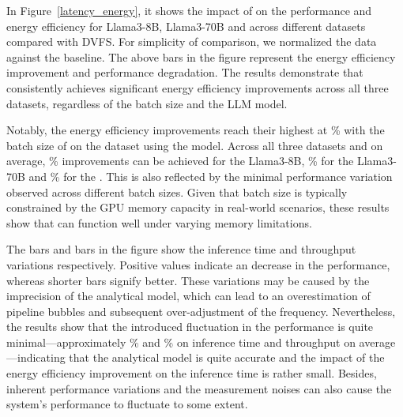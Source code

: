 In Figure~\ref{latency_energy}, it shows the impact of \thisproj{} on the performance and energy efficiency for Llama3-8B, Llama3-70B and  across different datasets compared with DVFS.
For simplicity of comparison, we normalized the data against the baseline.
The above bars in the figure represent the energy efficiency improvement and performance degradation.
The results demonstrate that \thisproj{} consistently achieves significant energy efficiency improvements across all three datasets, regardless of the batch size and the LLM model.

Notably, the energy efficiency improvements reach their highest at \% with the batch size of  on the  dataset using the  model.
Across all three datasets and on average, \% improvements can be achieved for the Llama3-8B, \% for the Llama3-70B and \% for the .
This is also reflected by the minimal performance variation observed across different batch sizes.
Given that batch size is typically constrained by the GPU memory capacity in real-world scenarios, these results show that \thisproj{} can function well under varying memory limitations.

The  bars and  bars in the figure show the inference time and throughput variations respectively.
Positive values indicate an decrease in the performance, whereas shorter bars signify better.
These variations may be caused by the imprecision of the analytical model, which can lead to an overestimation of pipeline bubbles and subsequent over-adjustment of the frequency.
Nevertheless, the results show that the introduced fluctuation in the performance is quite minimal—approximately \% and \% on inference time and throughput on average—indicating that the analytical model is quite accurate and the impact of the energy efficiency improvement on the inference time is rather small.
Besides, inherent performance variations and the measurement noises can also cause the system’s performance to fluctuate to some extent.


